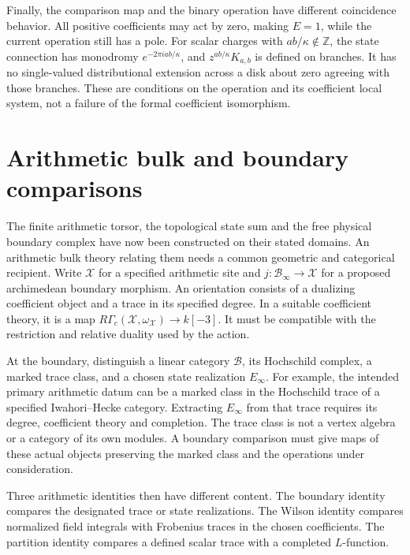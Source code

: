 Finally, the comparison map and the binary operation have different
coincidence behavior. All positive coefficients may act by zero, making
\(E=1\), while the current operation still has a pole. For scalar charges
with \(ab/\kappa\notin\mathbb Z\), the state connection has monodromy
\(e^{-2\pi iab/\kappa}\), and \(z^{ab/\kappa}K_{a,b}\) is defined on
branches. It has no single-valued distributional extension across a disk
about zero agreeing with those branches. These are conditions on the
operation and its coefficient local system, not a failure of the formal
coefficient isomorphism.

\section{Arithmetic bulk and boundary comparisons}
\label{v4-arith:cs:comparisons}

The finite arithmetic torsor, the topological state sum and the free
physical boundary complex have now been constructed on their stated domains.
An arithmetic bulk theory relating them needs a common geometric and
categorical recipient. Write \(\mathscr X\) for a specified arithmetic site
and \(j:\mathscr B_\infty\to\mathscr X\) for a proposed archimedean boundary
morphism. An orientation consists of a dualizing coefficient object and a
trace in its specified degree. In a suitable coefficient theory, it is a map
\(R\Gamma_c(\mathscr X,\omega_{\mathscr X})\to k[-3]\). It must be
compatible with the restriction and relative duality used by the action.

At the boundary, distinguish a linear category \(\mathcal B\), its
Hochschild complex, a marked trace class, and a chosen state realization
\(E_\infty\). For example, the intended primary arithmetic datum can be a
marked class in the Hochschild trace of a specified Iwahori--Hecke category.
Extracting \(E_\infty\) from that trace requires its degree, coefficient
theory and completion. The trace class is not a vertex algebra or a category
of its own modules. A boundary comparison must give maps of these actual
objects preserving the marked class and the operations under consideration.

Three arithmetic identities then have different content. The boundary
identity compares the designated trace or state realizations. The Wilson
identity compares normalized field integrals with Frobenius traces in the
chosen coefficients. The partition identity compares a defined scalar trace
with a completed \(L\)-function.

